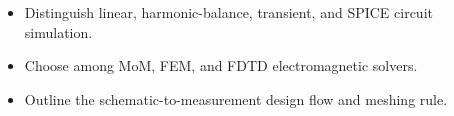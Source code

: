 \begin{objectives}
\begin{itemize}[leftmargin=1.4em,itemsep=2pt]
\item Distinguish linear, harmonic-balance, transient, and SPICE circuit simulation.
\item Choose among MoM, FEM, and FDTD electromagnetic solvers.
\item Outline the schematic-to-measurement design flow and meshing rule.
\end{itemize}
\end{objectives}
